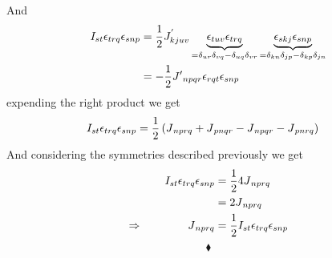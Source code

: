 And
\begin{align}
I_{st}\epsilon_{trq}\epsilon_{snp} &= \frac{1}{2} J^{'}_{kjuv} \underbrace{\epsilon_{tuv}\epsilon_{trq}}_{= \delta_{ur}\delta_{vq}-\delta_{uq}\delta_{vr}}\underbrace{\epsilon_{skj}\epsilon_{snp}}_{= \delta_{kn}\delta_{jp}-\delta_{kp}\delta_{jn}}\\
&= -\frac{1}{2} J{'}_{npqr} \epsilon_{rqt}\epsilon_{snp}
\end{align}
expending the right product we get
\begin{align}
I_{st}\epsilon_{trq}\epsilon_{snp} &= \frac{1}{2} \left( J{}_{nprq} +J{}_{pnqr}-J{}_{npqr}-J{}_{pnrq}\right)
\end{align}
And considering the symmetries described previously we get
\begin{align}
I_{st}\epsilon_{trq}\epsilon_{snp} &= \frac{1}{2} 4 J{}_{nprq}\\
&= 2 J{}_{nprq}\\
\Rightarrow \quad\quad\quad\quad J{}_{nprq}&= \frac{1}{2} I_{st}\epsilon_{trq}\epsilon_{snp} 
\end{align}
$$\blacklozenge$$
\newpage